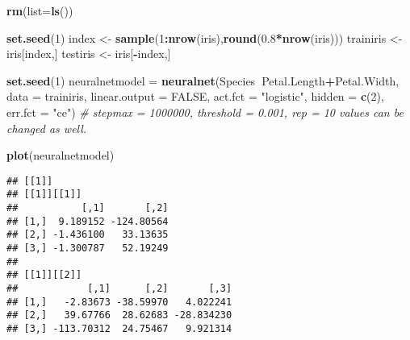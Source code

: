 \documentclass[
]{book}
\newenvironment{Shaded}{\begin{snugshade}}{\end{snugshade}}
\newcommand{\CommentTok}[1]{\textcolor[rgb]{0.56,0.35,0.01}{\textit{#1}}}
\newcommand{\DataTypeTok}[1]{\textcolor[rgb]{0.13,0.29,0.53}{#1}}
\newcommand{\DecValTok}[1]{\textcolor[rgb]{0.00,0.00,0.81}{#1}}
\newcommand{\FloatTok}[1]{\textcolor[rgb]{0.00,0.00,0.81}{#1}}
\newcommand{\KeywordTok}[1]{\textcolor[rgb]{0.13,0.29,0.53}{\textbf{#1}}}
\newcommand{\NormalTok}[1]{#1}
\newcommand{\OperatorTok}[1]{\textcolor[rgb]{0.81,0.36,0.00}{\textbf{#1}}}
\newcommand{\OtherTok}[1]{\textcolor[rgb]{0.56,0.35,0.01}{#1}}
\newcommand{\StringTok}[1]{\textcolor[rgb]{0.31,0.60,0.02}{#1}}
\begin{document}
\begin{Shaded}
\begin{Highlighting}[]
\KeywordTok{rm}\NormalTok{(}\DataTypeTok{list=}\KeywordTok{ls}\NormalTok{())}

\KeywordTok{set.seed}\NormalTok{(}\DecValTok{1}\NormalTok{)}
\NormalTok{index <-}\StringTok{ }\KeywordTok{sample}\NormalTok{(}\DecValTok{1}\OperatorTok{:}\KeywordTok{nrow}\NormalTok{(iris),}\KeywordTok{round}\NormalTok{(}\FloatTok{0.8}\OperatorTok{*}\KeywordTok{nrow}\NormalTok{(iris)))}
\NormalTok{trainiris <-}\StringTok{ }\NormalTok{iris[index,]}
\NormalTok{testiris <-}\StringTok{ }\NormalTok{iris[}\OperatorTok{-}\NormalTok{index,]}
\end{Highlighting}
\end{Shaded}

\begin{Shaded}
\begin{Highlighting}[]
\KeywordTok{set.seed}\NormalTok{(}\DecValTok{1}\NormalTok{)}
\NormalTok{neuralnetmodel =}\StringTok{ }\KeywordTok{neuralnet}\NormalTok{(Species}\OperatorTok{~}\NormalTok{Petal.Length}\OperatorTok{+}\NormalTok{Petal.Width, }\DataTypeTok{data =}\NormalTok{ trainiris, }
                           \DataTypeTok{linear.output =} \OtherTok{FALSE}\NormalTok{, }
                           \DataTypeTok{act.fct =} \StringTok{"logistic"}\NormalTok{,}
                           \DataTypeTok{hidden =} \KeywordTok{c}\NormalTok{(}\DecValTok{2}\NormalTok{), }\DataTypeTok{err.fct =} \StringTok{"ce"}\NormalTok{)}
\CommentTok{# stepmax = 1000000, threshold = 0.001, rep = 10 values can be changed as well.}
\end{Highlighting}
\end{Shaded}

\begin{Shaded}
\begin{Highlighting}[]
\KeywordTok{plot}\NormalTok{(neuralnetmodel)}
\end{Highlighting}
\end{Shaded}

\begin{Shaded}
\end{Shaded}

\begin{verbatim}
## [[1]]
## [[1]][[1]]
##           [,1]       [,2]
## [1,]  9.189152 -124.80564
## [2,] -1.436100   33.13635
## [3,] -1.300787   52.19249
## 
## [[1]][[2]]
##            [,1]      [,2]       [,3]
## [1,]   -2.83673 -38.59970   4.022241
## [2,]   39.67766  28.62683 -28.834230
## [3,] -113.70312  24.75467   9.921314
\end{verbatim}
\end{document}
